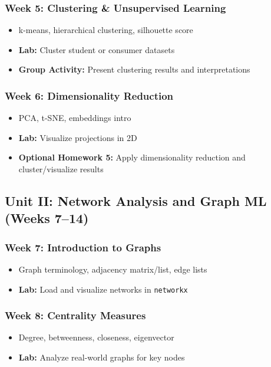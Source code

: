 \documentclass[12pt]{article}
\begin{document}
\subsubsection*{Week 5: Clustering \& Unsupervised Learning}
\begin{itemize}
  \item k-means, hierarchical clustering, silhouette score
  \item \textbf{Lab:} Cluster student or consumer datasets
  \item \textbf{Group Activity:} Present clustering results and interpretations
\end{itemize}

\subsubsection*{Week 6: Dimensionality Reduction}
\begin{itemize}
  \item PCA, t-SNE, embeddings intro
  \item \textbf{Lab:} Visualize projections in 2D
  \item \textbf{Optional Homework 5:} Apply dimensionality reduction and cluster/visualize results
\end{itemize}

\subsection*{Unit II: Network Analysis and Graph ML (Weeks 7--14)}

\subsubsection*{Week 7: Introduction to Graphs}
\begin{itemize}
  \item Graph terminology, adjacency matrix/list, edge lists
  \item \textbf{Lab:} Load and visualize networks in \texttt{networkx}
\end{itemize}

\subsubsection*{Week 8: Centrality Measures}
\begin{itemize}
  \item Degree, betweenness, closeness, eigenvector
  \item \textbf{Lab:} Analyze real-world graphs for key nodes
\end{itemize}
\end{document}
